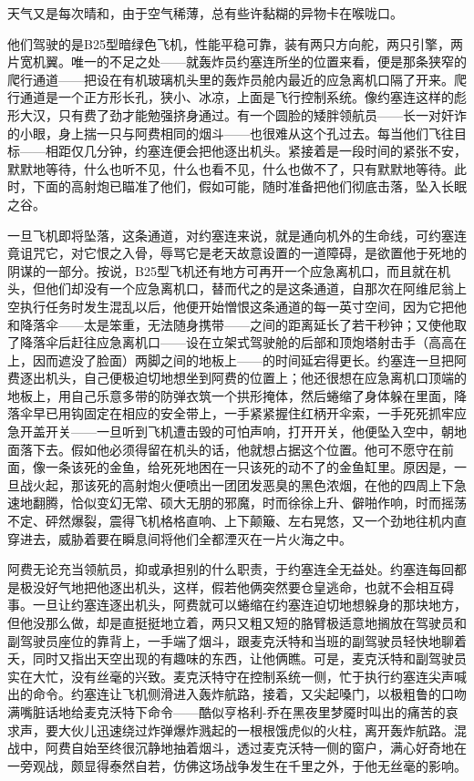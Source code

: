     天气又是每次晴和，由于空气稀薄，总有些许黏糊的异物卡在喉咙口。

    他们驾驶的是B25型暗绿色飞机，性能平稳可靠，装有两只方向舵，两只引擎，两片宽机翼。唯一的不足之处——就轰炸员约塞连所坐的位置来看，便是那条狭窄的爬行通道——把设在有机玻璃机头里的轰炸员舱内最近的应急离机口隔了开来。爬行通道是一个正方形长孔，狭小、冰凉，上面是飞行控制系统。像约塞连这样的彪形大汉，只有费了劲才能勉强挤身通过。有一个圆脸的矮胖领航员——长一对奸诈的小眼，身上揣一只与阿费相同的烟斗——也很难从这个孔过去。每当他们飞往目标——相距仅几分钟，约塞连便会把他逐出机头。紧接着是一段时间的紧张不安，默默地等待，什么也听不见，什么也看不见，什么也做不了，只有默默地等待。此时，下面的高射炮已瞄准了他们，假如可能，随时准备把他们彻底击落，坠入长眠之谷。

    一旦飞机即将坠落，这条通道，对约塞连来说，就是通向机外的生命线，可约塞连竟诅咒它，对它恨之入骨，辱骂它是老天故意设置的一道障碍，是欲置他于死地的阴谋的一部分。按说，B25型飞机还有地方可再开一个应急离机口，而且就在机头，但他们却没有一个应急离机口，替而代之的是这条通道，自那次在阿维尼翁上空执行任务时发生混乱以后，他便开始憎恨这条通道的每一英寸空间，因为它把他和降落伞——太是笨重，无法随身携带——之间的距离延长了若干秒钟；又使他取了降落伞后赶往应急离机口——设在立架式驾驶舱的后部和顶炮塔射击手（高高在上，因而遮没了脸面）两脚之间的地板上——的时间延宕得更长。约塞连一旦把阿费逐出机头，自己便极迫切地想坐到阿费的位置上；他还很想在应急离机口顶端的地板上，用自己乐意多带的防弹衣筑一个拱形掩体，然后蜷缩了身体躲在里面，降落伞早已用钩固定在相应的安全带上，一手紧紧握住红柄开伞索，一手死死抓牢应急开盖开关——一旦听到飞机遭击毁的可怕声响，打开开关，他便坠入空中，朝地面落下去。假如他必须得留在机头的话，他就想占据这个位置。他可不愿守在前面，像一条该死的金鱼，给死死地困在一只该死的动不了的金鱼缸里。原因是，一旦战火起，那该死的高射炮火便喷出一团团发恶臭的黑色浓烟，在他的四周上下急速地翻腾，恰似变幻无常、硕大无朋的邪魔，时而徐徐上升、僻啪作响，时而摇荡不定、砰然爆裂，震得飞机格格直响、上下颠簸、左右晃悠，又一个劲地往机内直穿进去，威胁着要在瞬息间将他们全都湮灭在一片火海之中。

    阿费无论充当领航员，抑或承担别的什么职责，于约塞连全无益处。约塞连每回都是极没好气地把他逐出机头，这样，假若他俩突然要仓皇逃命，也就不会相互碍事。一旦让约塞连逐出机头，阿费就可以蜷缩在约塞连迫切地想躲身的那块地方，但他没那么做，却是直挺挺地立着，两只又粗又短的胳臂极适意地搁放在驾驶员和副驾驶员座位的靠背上，一手端了烟斗，跟麦克沃特和当班的副驾驶员轻快地聊着夭，同时又指出天空出现的有趣味的东西，让他俩瞧。可是，麦克沃特和副驾驶员实在大忙，没有丝毫的兴致。麦克沃特守在控制系统一侧，忙于执行约塞连尖声喊出的命令。约塞连让飞机侧滑进入轰炸航路，接着，又尖起嗓门，以极粗鲁的口吻满嘴脏话地给麦克沃特下命令——酷似亨格利-乔在黑夜里梦魇时叫出的痛苦的哀求声，要大伙儿迅速绕过炸弹爆炸溅起的一根根饿虎似的火柱，离开轰炸航路。混战中，阿费自始至终很沉静地抽着烟斗，透过麦克沃特一侧的窗户，满心好奇地在一旁观战，颇显得泰然自若，仿佛这场战争发生在千里之外，于他无丝毫的影响。

